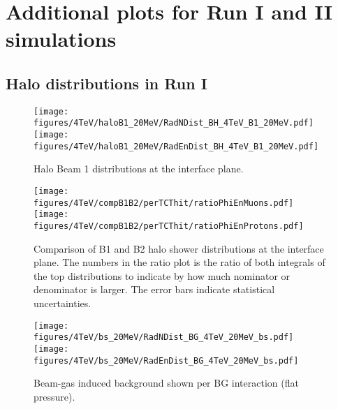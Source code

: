 \section{Additional plots for Run I and II simulations\label{run1run2app}}
\clearpage
\subsection{Halo distributions in Run I}

\begin{figure}[!htb]
\begin{center}

\texttt{[image: figures/4TeV/haloB1\_20MeV/RadNDist\_BH\_4TeV\_B1\_20MeV.pdf]}
\texttt{[image: figures/4TeV/haloB1\_20MeV/RadEnDist\_BH\_4TeV\_B1\_20MeV.pdf]}

\end{center}
\vspace{-0.6cm}
 \caption{Halo Beam 1 distributions at the interface plane. 
  \label{dist4TeVB12}}
\end{figure}

\begin{figure}%
\begin{center}
\texttt{[image: figures/4TeV/compB1B2/perTCThit/ratioPhiEnMuons.pdf]}
\texttt{[image: figures/4TeV/compB1B2/perTCThit/ratioPhiEnProtons.pdf]}
\end{center}
\vspace{-0.6cm}
\caption{Comparison of B1 and B2 halo shower distributions at the interface plane. The numbers in the ratio plot is the ratio of both integrals of the top distributions to indicate by how much nominator or denominator is larger. The error bars indicate statistical uncertainties.
  \label{comp4TeVB1B2}}
\end{figure}


\begin{figure}%
\begin{center}
\texttt{[image: figures/4TeV/bs\_20MeV/RadNDist\_BG\_4TeV\_20MeV\_bs.pdf]}
\texttt{[image: figures/4TeV/bs\_20MeV/RadEnDist\_BG\_4TeV\_20MeV\_bs.pdf]}
\end{center}
\vspace{-0.6cm}
 \caption{Beam-gas induced background shown per BG interaction (flat pressure).
  \label{dist4TeVBGbs2}}
\end{figure}

